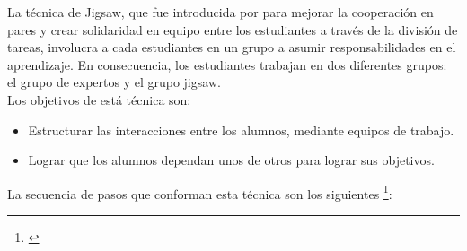 La técnica de Jigsaw, que fue introducida por  para mejorar la cooperación en pares y crear solidaridad en equipo entre los estudiantes a través de la división de tareas, involucra a cada estudiantes en un grupo a asumir responsabilidades en el aprendizaje. En consecuencia, los estudiantes trabajan en dos diferentes grupos: el grupo de expertos y el grupo jigsaw.\\

Los objetivos de está técnica son:

\begin{itemize}
  \item Estructurar las interacciones entre los alumnos, mediante equipos de trabajo.
  \item Lograr que los alumnos dependan unos de otros para lograr sus objetivos.
\end{itemize}

La secuencia de pasos que conforman esta técnica son los siguientes \footnote{\cite{upm_2008}}:

